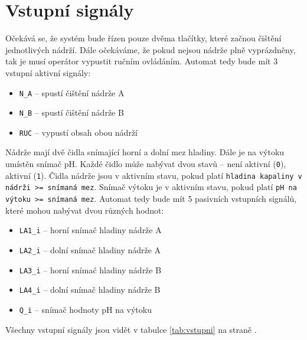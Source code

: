 \documentclass[12pt]{report}
\begin{document}
	\section{Vstupní signály}
	Očekává se, že systém bude řízen pouze dvěma tlačítky, které začnou čištění jednotlivých nádrží. Dále očekáváme, že pokud nejsou nádrže plně vyprázdněny, tak je musí operátor vypustit ručním ovládáním. Automat tedy bude mít 3 vstupní aktivní signály: 
	
	\begin{itemize}
		\item \texttt{N\_A} – spustí čištění nádrže A
		\item \texttt{N\_B} – spustí čištění nádrže B
		\item \texttt{RUC} – vypustí obsah obou nádrží 
	\end{itemize}

	Nádrže mají dvě čidla snímající horní a dolní mez hladiny. Dále je na výtoku umístěn snímač pH. Každé čidlo může nabývat dvou stavů – není aktivní (\texttt{0}), aktivní (\texttt{1}). Čidla nádrže jsou v aktivním stavu, pokud platí \texttt{hladina kapaliny v nádrži >= snímaná mez}. Snímač výtoku je v aktivním stavu, pokud platí \texttt{pH na výtoku >= snímaná mez}. Automat tedy bude mít 5 pasivních vstupních signálů, které mohou nabývat dvou různých hodnot:

	\begin{itemize}
		\item \texttt{LA1\_i} – horní snímač hladiny nádrže A
		\item \texttt{LA2\_i} – dolní snímač hladiny nádrže A
		\item \texttt{LA3\_i} – horní snímač hladiny nádrže B
		\item \texttt{LA4\_i} – dolní snímač hladiny nádrže B
		\item \texttt{Q\_i} – snímač hodnoty pH na výtoku
	\end{itemize}

	Všechny vstupní signály jsou vidět v tabulce \ref{tab:vstupni} na straně \pageref{tab:vstupni}.
\end{document}
